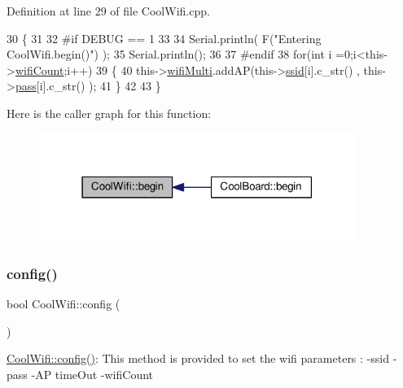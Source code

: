 Definition at line 29 of file Cool\+Wifi.\+cpp.


\begin{DoxyCode}
30 \{ 
31 
32 \textcolor{preprocessor}{#if DEBUG == 1 }
33 
34     Serial.println( F(\textcolor{stringliteral}{"Entering CoolWifi.begin()"}) );
35     Serial.println();
36 
37 \textcolor{preprocessor}{#endif}
38     \textcolor{keywordflow}{for}(\textcolor{keywordtype}{int} i =0;i<this->\hyperlink{class_cool_wifi_ab133bd92fcb895b884deecd6678592e4}{wifiCount};i++)
39     \{
40          this->\hyperlink{class_cool_wifi_a7862a8c0d7239877e2956c14a368aab8}{wifiMulti}.addAP(this->\hyperlink{class_cool_wifi_a893b21d0fed821438733bba2e73fb4c2}{ssid}[i].c\_str() , this->\hyperlink{class_cool_wifi_a0c3332a149245aaad060b32593a54c9b}{pass}[i].c\_str() );    
41     \}
42     
43 \}
\end{DoxyCode}
Here is the caller graph for this function\+:\nopagebreak
\begin{figure}[H]
\begin{center}
\leavevmode
\includegraphics[width=291pt]{d7/d29/class_cool_wifi_a46942fed90e475112cc10b78a32e7aaa_icgraph}
\end{center}
\end{figure}
\mbox{\label{class_cool_wifi_a4eb2f6b9b09dd588964b88b6c70122c0}} 
\subsubsection{\texorpdfstring{config()}{config()}\hspace{0.1cm}{\footnotesize\ttfamily [1/2]}}
{\footnotesize\ttfamily bool Cool\+Wifi\+::config (\begin{DoxyParamCaption}{ }\end{DoxyParamCaption})}

\hyperlink{class_cool_wifi_a4eb2f6b9b09dd588964b88b6c70122c0}{Cool\+Wifi\+::config()}\+: This method is provided to set the wifi parameters \+: -\/ssid -\/pass -\/\+AP time\+Out -\/wifi\+Count

